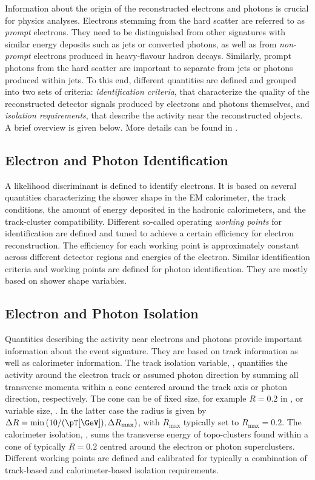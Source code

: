 Information about the origin of the reconstructed electrons and photons is crucial for physics analyses.
Electrons stemming from the hard scatter are referred to as \emph{prompt} electrons. They need to be distinguished from other signatures with similar energy deposits such as jets or converted photons, as well as from \emph{non-prompt} electrons produced in heavy-flavour hadron decays.
Similarly, prompt photons from the hard scatter are important to separate from jets or photons produced within jets.
To this end, different quantities are defined and grouped into two sets of criteria: \emph{identification criteria}, that characterize the quality of the reconstructed detector signals produced by electrons and photons themselves, and \emph{isolation requirements}, that describe the activity near the reconstructed objects. A brief overview is given below. More details can be found in .

\subsection{Electron and Photon Identification}
A likelihood discriminant is defined to identify electrons. It is based on several quantities characterizing the shower shape in the EM calorimeter, the track conditions, the amount of energy deposited in the hadronic calorimeters, and the track-cluster compatibility. Different so-called operating \emph{working points} for identification are defined and tuned to achieve a certain efficiency for electron reconstruction. The efficiency for each working point is approximately constant across different detector regions and energies of the electron.
Similar identification criteria and working points are defined for photon identification. They are mostly based on shower shape variables.

\subsection{Electron and Photon Isolation}
Quantities describing the activity near electrons and photons provide important information about the event signature. They are based on track information as well as calorimeter information.
The track isolation variable, \pTcone, quantifies the activity around the electron track or assumed photon direction by summing all transverse momenta within a cone centered around the track axis or photon direction, respectively. The cone can be of fixed size, for example $R=0.2$ in \pTconetwenty, or variable size, \pTvarcone. In the latter case the radius is given by $\Delta R = \text{min} \left( 10 / (\pT \text{[\GeV])}, \Delta R_{\text{max}}  \right)$, with $R_{\text{max}}$ typically set to $R_{\text{max}} = 0.2$.
The calorimeter isolation, \ETconetwenty, sums the transverse energy of topo-clusters found within a cone of typically $R=0.2$ centred around the electron or photon superclusters.
Different working points are defined and calibrated for typically a combination of track-based and calorimeter-based isolation requirements.

